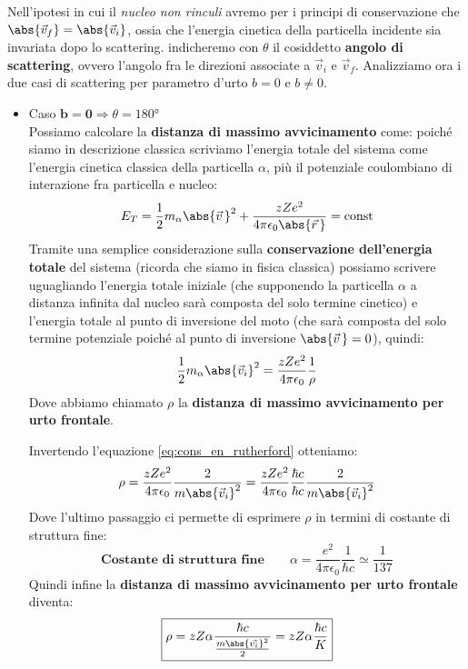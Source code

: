 Nell'ipotesi in cui il \textit{nucleo non rinculi} avremo per i principi di
conservazione che $\abs{\vec{v}_f} = \abs{\vec{v}_i}$, ossia che l'energia
cinetica della particella incidente sia invariata dopo lo scattering.
indicheremo con $\theta$ il cosiddetto \textbf{angolo di scattering}, ovvero
l'angolo fra le direzioni associate a $\vec{v}_{i}$ e $\vec{v}_{f}$.
Analizziamo ora i due casi di scattering per parametro d'urto $b=0$ e $b\neq0$.
\begin{itemize}
	\item Caso $\boxed{\boldsymbol{b = 0} \Rightarrow \theta =
			      180\si{\degree}}$\\
	      Possiamo calcolare la \textbf{distanza di massimo avvicinamento} come:
	      poiché siamo in descrizione classica scriviamo l'energia totale del sistema
	      come l'energia cinetica classica della particella $\alpha$, più il
	      potenziale coulombiano di interazione fra particella e nucleo:
	      \begin{equation}
		      E_T = \frac{1}{2}m_\alpha \abs{\vec{v}\,}^2 + \frac{zZe^2}{4\pi\epsilon_0
			      \abs{\vec{r}\,}} = \text{const}
	      \end{equation}
	      Tramite una semplice considerazione sulla \textbf{conservazione
		      dell'energia totale} del sistema (ricorda che siamo in fisica classica)
	      possiamo scrivere uguagliando l'energia totale iniziale (che supponendo la
	      particella $\alpha$ a distanza infinita dal nucleo sarà composta del solo
	      termine cinetico) e l'energia totale al punto di inversione del moto (che
	      sarà composta del solo termine potenziale poiché al punto di inversione
	      $\abs{\vec{v}\,} = 0$),
	      quindi:
	      \begin{equation}
		      \frac{1}{2}m_\alpha \abs{\vec{v}_i}^2 =
		      \frac{zZe^2}{4\pi\epsilon_0}\frac{1}{\rho}
		      \label{eq:cons_en_rutherford}
	      \end{equation}
	      Dove abbiamo chiamato $\rho$ la \textbf{distanza di massimo
		      avvicinamento per urto frontale}.

	      Invertendo l'equazione \ref{eq:cons_en_rutherford} otteniamo:
	      \begin{equation}
		      \rho = \frac{zZe^2}{4\pi\epsilon_0}\frac{2}{m\abs{\vec{v}_i}^2} =
		      \frac{zZe^2}{4\pi\epsilon_0}\frac{\hbar c}{\hbar
			      c}\frac{2}{m\abs{\vec{v}_i}^2}
	      \end{equation}
	      Dove l'ultimo passaggio ci permette di esprimere $\rho$ in termini di
	      costante di struttura fine:
	      \begin{equation}
		      \textbf{Costante di struttura fine}
		      \qquad
		      \boxed{
			      \alpha = \frac{e^2}{4\pi\epsilon_0}\frac{1}{\hbar c} \simeq
			      \frac{1}{137}
		      }
	      \end{equation}
	      Quindi infine la \textbf{distanza di massimo avvicinamento per urto
		      frontale} diventa:
	      \begin{equation}
		      \boxed{
			      \rho = zZ\alpha\frac{\hbar c}{\frac{m\abs{\vec{v_i}}^2}{2}} =
			      zZ\alpha\frac{\hbar c}{K}
		      }
		      \label{eq:dist_max_avvicinamento}
	      \end{equation}


\end{itemize}
